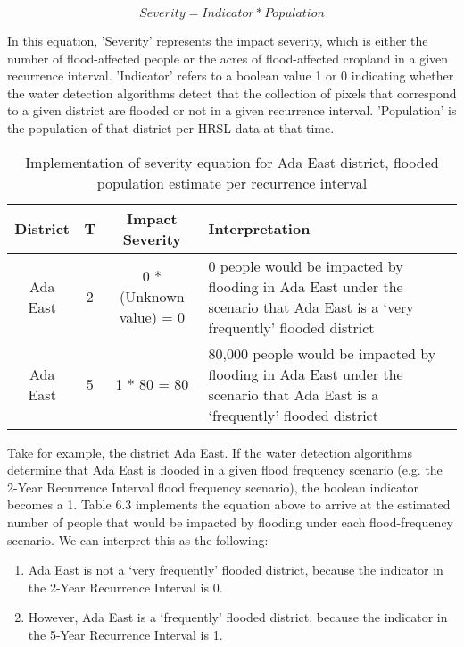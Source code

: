 \begin{equation}
Severity = Indicator * Population
\end{equation}

In this equation, 'Severity' represents the impact severity, which is either the number of flood-affected people or the acres of flood-affected cropland in a given recurrence interval. 'Indicator' refers to a boolean value 1 or 0 indicating whether the water detection algorithms detect that the collection of pixels that correspond to a given district are flooded or not in a given recurrence interval. 'Population' is the population of that district per HRSL data at that time.\\

\begin{table}
\centering
\begin{tabular}{|c|c|c|p{7cm}|}
\hline
\textbf{District} & \textbf{T} & \textbf{Impact Severity} & \textbf{Interpretation}\\
\hline
Ada East\rule{0pt}{4ex} & 2 & 0 * (Unknown value) = 0 & 0 people would be impacted by flooding in Ada East under the scenario that Ada East is a ‘very frequently’ flooded district \\
Ada East\rule{0pt}{4ex} & 5 & 1 * 80 = 80 & 80,000 people would be impacted by flooding in Ada East under the scenario that Ada East is a ‘frequently’ flooded district \\
\hline
\end{tabular}
\caption{Implementation of severity equation for Ada East district, flooded population estimate per recurrence interval}
\end{table}

Take for example, the district Ada East. If the water detection algorithms determine that Ada East is flooded in a given flood frequency scenario (e.g. the 2-Year Recurrence Interval flood frequency scenario), the boolean indicator becomes a 1. Table 6.3 implements the equation above to arrive at the estimated number of people that would be impacted by flooding under each flood-frequency scenario. We can interpret this as the following:

\begin{enumerate}
  \item Ada East is not a ‘very frequently’ flooded district, because the indicator in the 2-Year Recurrence Interval is 0.
  \item However, Ada East is a ‘frequently’ flooded district, because the indicator in the 5-Year Recurrence Interval is 1.
\end{enumerate}

